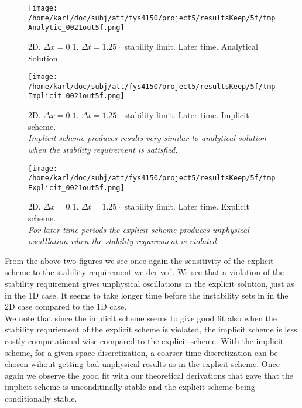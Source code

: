 \documentclass{article}
\begin{document}
\begin{minipage}{.30\textwidth} 
	\begin{figure}[H]
		\centering
		\texttt{[image: /home/karl/doc/subj/att/fys4150/project5/resultsKeep/5f/tmpAnalytic\_0021out5f.png]}
		\caption{2D. $\Delta x = 0.1$. $\Delta t = 1.25 \cdot$ stability limit. Later time. Analytical Solution.\\ \textit{}}
		\label{fig:fig2d10}
	\end{figure}
\end{minipage}\hfill
\begin{minipage}{.30\textwidth} 
	\begin{figure}[H]
		\centering
		\texttt{[image: /home/karl/doc/subj/att/fys4150/project5/resultsKeep/5f/tmpImplicit\_0021out5f.png]}
		\caption{2D. $\Delta x = 0.1$. $\Delta t = 1.25 \cdot$ stability limit. Later time. Implicit scheme.\\ \textit{Implicit scheme produces results very similar to analytical solution when the stability requirement is satisfied.}}
		\label{fig:fig2d11}
	\end{figure}
\end{minipage}\hfill
\begin{minipage}{.30\textwidth} 
	\begin{figure}[H]
		\centering
		\texttt{[image: /home/karl/doc/subj/att/fys4150/project5/resultsKeep/5f/tmpExplicit\_0021out5f.png]}
		\caption{2D. $\Delta x = 0.1$. $\Delta t = 1.25 \cdot$ stability limit. Later time. Explicit scheme.\\ \textit{For later time periods the explicit scheme produces unphysical oscilllation when the stability requirement is violated.}}
		\label{fig:fig2d12}
	\end{figure}
\end{minipage}\hfill
\vspace{2ex}

From the above two figures we see once again the sensitivity of the explicit scheme to the stability requirement we derived. We see that a  violation of the stability requirement gives unphysical oscillations in the explicit solution, just as in the 1D case. It seems to take longer time before the instability sets in in the 2D case compared to the 1D case.\\

We note that since the implicit scheme seems to give good fit also when the stability requriement of the explicit scheme is violated, the implicit scheme is less costly computational wise compared to the explicit scheme. With the implicit scheme, for a given space discretization, a coarser time discretization can be chosen wihout getting bad unphysical results as in the explicit scheme. Once again we observe the good fit with our theoretical derivations that gave that the implicit scheme is unconditinally stable and the explicit scheme being conditionally stable.\\
\end{document}
